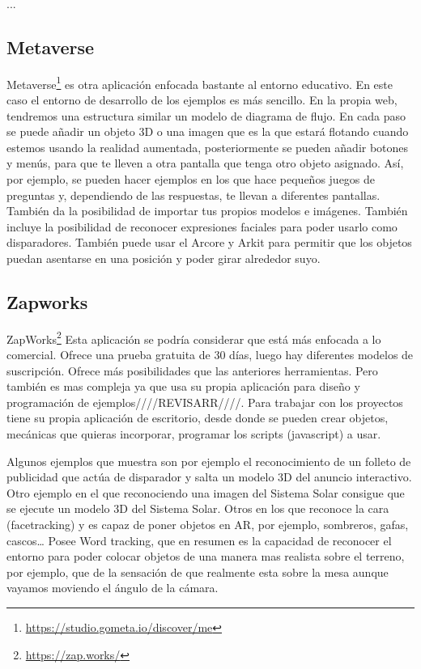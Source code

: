 ...

\subsection{Metaverse} Metaverse\footnote{\url{https://studio.gometa.io/discover/me}} es otra aplicación enfocada bastante al entorno educativo. En este caso el entorno de desarrollo de los ejemplos es más sencillo. En la propia web, tendremos una estructura similar un modelo de diagrama de flujo. En cada paso se puede añadir un objeto 3D o una imagen que es la que estará flotando cuando estemos usando la realidad aumentada, posteriormente se pueden añadir botones y menús, para que te lleven a otra pantalla que tenga otro objeto asignado. Así, por ejemplo, se pueden hacer ejemplos en los que hace pequeños juegos de preguntas y, dependiendo de las respuestas, te llevan a diferentes pantallas.
También da la posibilidad de importar tus propios modelos e imágenes.
También incluye la posibilidad de reconocer expresiones faciales para poder usarlo como disparadores.
También puede usar el Arcore y Arkit para permitir que los objetos puedan asentarse en una posición y poder girar alrededor suyo.

\subsection{Zapworks} ZapWorks\footnote{\url{https://zap.works/}}
Esta aplicación se podría considerar que está más enfocada a lo comercial. Ofrece una prueba gratuita de 30 días, luego hay diferentes modelos de suscripción.
Ofrece más posibilidades que las anteriores herramientas. Pero también es mas compleja ya que usa su propia aplicación para diseño y programación de ejemplos////REVISARR////.
Para trabajar con los proyectos tiene su propia aplicación de escritorio, desde donde se pueden crear objetos, mecánicas que quieras incorporar, programar los scripts (javascript) a usar.

Algunos ejemplos que muestra son por ejemplo el reconocimiento de un folleto de publicidad que actúa de disparador y salta un modelo 3D del anuncio interactivo. Otro ejemplo en el que reconociendo una imagen del Sistema Solar consigue que se ejecute un modelo 3D del Sistema Solar. 
Otros en los que reconoce la cara (facetracking) y es capaz de poner objetos en AR, por ejemplo, sombreros, gafas, cascos…
Posee Word tracking, que en resumen es la capacidad de reconocer el entorno para poder colocar objetos de una manera mas realista sobre el terreno, por ejemplo, que de la sensación de que realmente esta sobre la mesa aunque vayamos moviendo el ángulo de la cámara.

